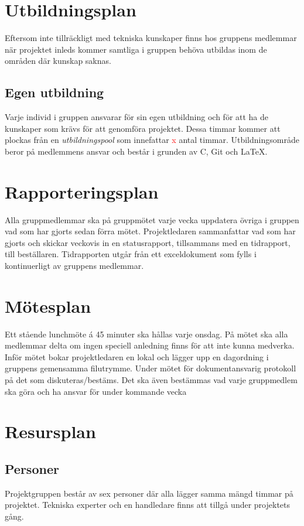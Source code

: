 \documentclass[11pt]{article}
\begin{document}
\begin{flushleft}
\pagebreak
\section{Utbildningsplan}
Eftersom inte tillräckligt med tekniska kunskaper finns hos gruppens medlemmar när projektet inleds kommer samtliga i gruppen behöva utbildas inom de områden där kunskap saknas. 
\subsection{Egen utbildning}
Varje individ i gruppen ansvarar för sin egen utbildning och för att ha de kunskaper som krävs för att genomföra projektet. Dessa timmar kommer att plockas från en \textit{utbildningspool} som innefattar \textcolor{red}{x} antal timmar. Utbildningsområde beror på medlemmens ansvar och består i grunden av C, Git och \LaTeX. 


\pagebreak
\section{Rapporteringsplan}
Alla gruppmedlemmar ska på gruppmötet varje vecka uppdatera övriga i gruppen vad som har gjorts sedan förra mötet. Projektledaren sammanfattar vad som har gjorts och skickar veckovis in en statusrapport, tillsammans med en tidrapport, till beställaren. Tidrapporten utgår från ett exceldokument som fylls i kontinuerligt av gruppens medlemmar.

\pagebreak
\section{Mötesplan}
Ett stående lunchmöte á 45 minuter ska hållas varje onsdag. På mötet ska alla medlemmar delta om ingen speciell anledning finns för att inte kunna medverka. Inför mötet bokar projektledaren en lokal och lägger upp en dagordning i gruppens gemensamma filutrymme. Under mötet för dokumentansvarig protokoll på det som diskuteras/bestäms. Det ska även bestämmas vad varje gruppmedlem ska göra och ha ansvar för under kommande vecka

\pagebreak
\section{Resursplan}
\subsection{Personer}
Projektgruppen består av sex personer där alla lägger samma mängd timmar på projektet. Tekniska experter och en handledare finns att tillgå under projektets gång.


\end{flushleft}
\end{document}
